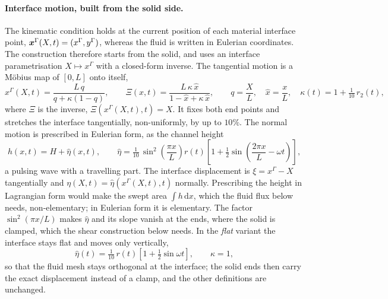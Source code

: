 \paragraph{Interface motion, built from the solid side.}
The kinematic condition holds at the current position of each material interface point, $\boldsymbol{x}^\Gamma(X,t) = (x^\Gamma, y^\Gamma)$, whereas the fluid is written in Eulerian coordinates.
The construction therefore starts from the solid, and uses an interface parametrisation $X \mapsto x^\Gamma$ with a closed-form inverse.
The tangential motion is a M\"obius map of $[0,L]$ onto itself,
\begin{equation}
	x^\Gamma(X,t) = \frac{L\,q}{q + \kappa(1-q)}, \qquad
	\Xi(x,t) = \frac{L\,\kappa\,\hat{x}}{1 - \hat{x} + \kappa\,\hat{x}}, \qquad
	q = \frac{X}{L}, \quad \hat{x} = \frac{x}{L}, \quad \kappa(t) = 1 + \tfrac{1}{10}\,r_2(t),
	\label{eq:mms_mobius}
\end{equation}
where $\Xi$ is the inverse, $\Xi(x^\Gamma(X,t),t) = X$.
It fixes both end points and stretches the interface tangentially, non-uniformly, by up to $10\%$.
The normal motion is prescribed in Eulerian form, as the channel height
\begin{equation}
	h(x,t) = H + \hat\eta(x,t), \qquad
	\hat\eta = \tfrac{1}{10}\,\sin^2\!\left(\frac{\pi x}{L}\right) r(t)\left[1 + \tfrac{1}{2}\sin\!\left(\frac{2\pi x}{L} - \omega t\right)\right],
	\label{eq:mms_height}
\end{equation}
a pulsing wave with a travelling part.
The interface displacement is $\xi = x^\Gamma - X$ tangentially and $\eta(X,t) = \hat\eta(x^\Gamma(X,t),t)$ normally.
Prescribing the height in Lagrangian form would make the swept area $\int h\,\mathrm{d}x$, which the fluid flux below needs, non-elementary; in Eulerian form it is elementary.
The factor $\sin^2(\pi x/L)$ makes $\hat\eta$ and its slope vanish at the ends, where the solid is clamped, which the shear construction below needs.
In the \emph{flat} variant the interface stays flat and moves only vertically,
\begin{equation}
	\hat\eta(t) = \tfrac{1}{10}\,r(t)\left[1 + \tfrac12\sin\omega t\right], \qquad \kappa = 1,
	\label{eq:mms_flat}
\end{equation}
so that the fluid mesh stays orthogonal at the interface; the solid ends then carry the exact displacement instead of a clamp, and the other definitions are unchanged.

